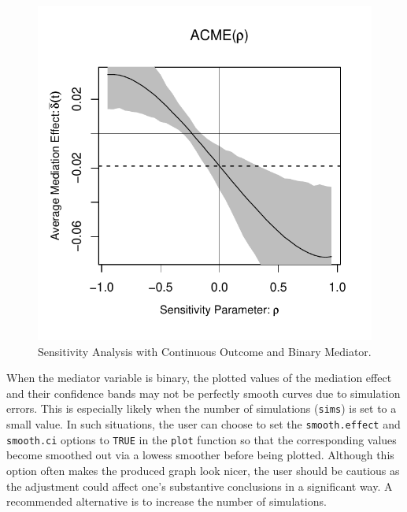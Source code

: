 \documentclass[11pt,letterpaper]{article}
\theoremstyle{plain}
\begin{document}
\begin{figure}[t]
\vspace{-.5in}
\begin{center}
\includegraphics[scale=.8]{BinaryMediator-Sensitivity-Rpaper.pdf}
\end{center}
\vspace{-.5in}
\caption{Sensitivity Analysis with Continuous Outcome and Binary Mediator.
  \label{SensBinMed}}
\end{figure}

When the mediator variable is binary, the plotted values of the mediation effect
and their confidence bands may not be perfectly smooth curves due to simulation errors.
This is especially likely when the number of simulations (\texttt{sims}) is set
to a small value.  In such situations, the user can choose to set the
\texttt{smooth.effect} and \texttt{smooth.ci} options to \texttt{TRUE} in the
\texttt{plot} function so that the corresponding values become smoothed
out via a lowess smoother before being plotted.  Although this option
often makes the produced graph look nicer, the user should be cautious as
the adjustment could affect one's substantive conclusions in a
significant way.  A recommended alternative is to increase the number of
simulations.
\end{document}
